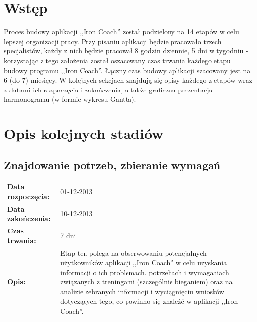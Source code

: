 

\tableofcontents
\clearpage
\newcommand{\tabb}{\begin{tabular}{l p{8cm}}}
\renewcommand{\subsectionmark}[1]{}
\section{Wstęp}
	Proces budowy aplikacji ,,Iron Coach'' został podzielony na 14 etapów w celu lepszej organizacji pracy. Przy pisaniu aplikacji będzie pracowało trzech specjalistów, każdy z nich będzie pracował 8 godzin dziennie, 5 dni w tygodniu - korzystając z tego założenia został oszacowany czas trwania każdego etapu budowy programu ,,Iron Coach''. Łączny czas budowy aplikacji szacowany jest na 6 (do 7) miesięcy.
	W kolejnych sekcjach znajdują się opisy każdego z etapów wraz z datami ich rozpoczęcia i zakończenia, a także graficzna prezentacja harmonogramu (w formie wykresu Gantta).
\section{Opis kolejnych stadiów}
\subsection{Znajdowanie potrzeb, zbieranie wymagań}
	\tabb
		\textbf{Data rozpoczęcia:} & 01-12-2013\\
		\textbf{Data zakończenia:} & 10-12-2013\\
		\textbf{Czas trwania:} & 7 dni\\
		\textbf{Opis:} & Etap ten polega na obserwowaniu potencjalnych użytkowników aplikacji ,,Iron Coach'' w celu uzyskania informacji o ich problemach, potrzebach i wymaganiach związanych z treningami (szczególnie bieganiem) oraz na analizie zebranych informacji i wyciągnięciu wniosków dotyczących tego, co powinno się znaleźć w aplikacji ,,Iron Coach''.
	\end{tabular}
